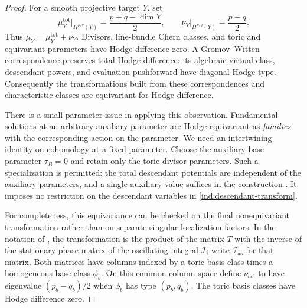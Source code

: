 \begin{proof}
For a smooth projective target $Y$, set
\[
 \mu^{\mathrm{tot}}_Y\big|_{H^{p,q}(Y)}
       =\frac{p+q-\dim Y}{2},\qquad
 \nu_Y\big|_{H^{p,q}(Y)}=\frac{p-q}{2}.
\]
Thus $\mu_Y=\mu_Y^{\mathrm{tot}}+\nu_Y$. Divisors, line-bundle Chern
classes, and toric and equivariant parameters have Hodge difference
zero. A Gromov--Witten correspondence preserves total Hodge difference:
its algebraic virtual class, descendant powers, and evaluation
pushforward have diagonal Hodge type. Consequently the transformations
built from these correspondences and characteristic classes are
equivariant for Hodge difference.

There is a small parameter issue in applying this observation.
Fundamental solutions at an arbitrary auxiliary parameter are
Hodge-equivariant as \emph{families}, with the corresponding action on
the parameter. We need an intertwining identity on cohomology at a
fixed parameter. Choose the auxiliary base parameter $\tau_B=0$ and
retain only the toric divisor parameters. Such a specialization is
permitted: the total descendant potentials are independent of the
auxiliary parameters, and a single auxiliary value suffices in the
construction \cite[\S4, footnote~11]{CGT}. It imposes no restriction on
the descendant variables in \eqref{ind:descendant-transform}.

For completeness, this equivariance can be checked on the final
nonequivariant transformation rather than on separate singular
localization factors. In the notation of \cite[\S4.4]{CGT}, the
transformation is the product of the matrix $T$ with the inverse of the
stationary-phase matrix of the oscillating integral $\mathcal I$;
write $\mathcal I_{\mathrm{as}}$ for that matrix. Both matrices have
columns indexed by a toric basis class times a homogeneous base class
$\phi_b$. On this common column space define $\nu_{\mathrm{col}}$ to
have eigenvalue $(p_b-q_b)/2$ when $\phi_b$ has type $(p_b,q_b)$.
The toric basis classes have Hodge difference zero.


\end{proof}
